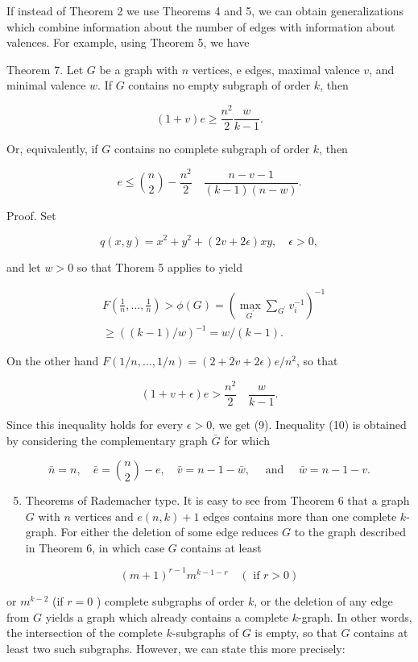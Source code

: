 \documentclass[10pt]{article}
\begin{document}
If instead of Theorem 2 we use Theorems 4 and 5, we can obtain generalizations which combine information about the number of edges with information about valences. For example, using Theorem 5, we have

Theorem 7. Let \(G\) be a graph with \(n\) vertices, e edges, maximal valence \(v\), and minimal valence \(w\). If \(G\) contains no empty subgraph of order \(k\), then

\[
(1+v) e \geqslant \frac{n^{2}}{2} \frac{w}{k-1} .
\]

Or, equivalently, if \(G\) contains no complete subgraph of order \(k\), then

\[
e \leqslant\binom{ n}{2}-\frac{n^{2}}{2} \quad \frac{n-v-1}{(k-1)(n-w)} .
\]

Proof. Set

\[
q(x, y)=x^{2}+y^{2}+(2 v+2 \epsilon) x y, \quad \epsilon>0,
\]

and let \(w>0\) so that Thorem 5 applies to yield

\[
\begin{aligned}
& F\left(\frac{1}{n}, \ldots, \frac{1}{n}\right)>\phi(G)=\left(\max _{G^{\prime}} \sum_{G^{\prime}} v_{i}^{-1}\right)^{-1} \\
& \geqslant((k-1) / w)^{-1}=w /(k-1) .
\end{aligned}
\]

On the other hand \(F(1 / n, \ldots, 1 / n)=(2+2 v+2 \epsilon) e / n^{2}\), so that

\[
(1+v+\epsilon) e>\frac{n^{2}}{2} \quad \frac{w}{k-1} .
\]

Since this inequality holds for every \(\epsilon>0\), we get (9). Inequality (10) is obtained by considering the complementary graph \(\bar{G}\) for which

\[
\bar{n}=n, \quad \bar{e}=\binom{n}{2}-e, \quad \bar{v}=n-1-\bar{w}, \quad \text { and } \quad \bar{w}=n-1-v .
\]

\begin{enumerate}
  \setcounter{enumi}{4}
  \item Theorems of Rademacher type. It is easy to see from Theorem 6 that a graph \(G\) with \(n\) vertices and \(e(n, k)+1\) edges contains more than one complete \(k\)-graph. For either the deletion of some edge reduces \(G\) to the graph described in Theorem 6, in which case \(G\) contains at least
\end{enumerate}

\[
(m+1)^{r-1} m^{k-1-r} \quad(\text { if } r>0)
\]

or \(m^{k-2}\) (if \(r=0\) ) complete subgraphs of order \(k\), or the deletion of any edge from \(G\) yields a graph which already contains a complete \(k\)-graph. In other words, the intersection of the complete \(k\)-subgraphs of \(G\) is empty, so that \(G\) contains at least two such subgraphs. However, we can state this more precisely:
\end{document}
